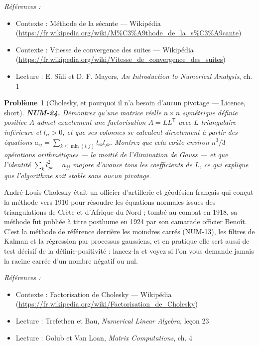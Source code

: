 \documentclass[11pt]{article}
\newtheorem{problem}{Problème}
\newenvironment{refs}{\par\small\noindent\emph{Références :}\begin{itemize}\setlength\itemsep{0pt}}{\end{itemize}\normalsize}
\begin{document}
\begin{refs}
\item Contexte : Méthode de la sécante --- Wikipédia (\url{https://fr.wikipedia.org/wiki/M%C3%A9thode_de_la_s%C3%A9cante})
\item Contexte : Vitesse de convergence des suites --- Wikipédia (\url{https://fr.wikipedia.org/wiki/Vitesse_de_convergence_des_suites})
\item Lecture : E. Süli et D. F. Mayers, \textit{An Introduction to Numerical Analysis}, ch. 1
\end{refs}

\bigskip

\begin{problem}[{Cholesky, et pourquoi il n'a besoin d'aucun pivotage --- Licence, short}]
\textbf{NUM-24.} Démontrez qu'une matrice réelle $n \times n$ symétrique définie positive $A$ admet exactement une factorisation $A = L L^{\mathsf T}$ avec $L$ triangulaire inférieure et $l_{ii} > 0$, et que ses colonnes se calculent directement à partir des équations $a_{ij} = \sum_{k \le \min(i,j)} l_{ik} l_{jk}$. Montrez que cela coûte environ $n^3/3$ opérations arithmétiques --- la moitié de l'élimination de Gauss --- et que l'identité $\sum_{k} l_{jk}^2 = a_{jj}$ majore d'avance tous les coefficients de $L$, ce qui explique que l'algorithme soit stable sans aucun pivotage.
\end{problem}

\noindent André-Louis Cholesky était un officier d'artillerie et géodésien français qui conçut la méthode vers 1910 pour résoudre les équations normales issues des triangulations de Crète et d'Afrique du Nord ; tombé au combat en 1918, sa méthode fut publiée à titre posthume en 1924 par son camarade officier Benoît. C'est la méthode de référence derrière les moindres carrés (NUM-13), les filtres de Kalman et la régression par processus gaussiens, et en pratique elle sert aussi de test décisif de la définie-positivité : lancez-la et voyez si l'on vous demande jamais la racine carrée d'un nombre négatif ou nul.

\begin{refs}
\item Contexte : Factorisation de Cholesky --- Wikipédia (\url{https://fr.wikipedia.org/wiki/Factorisation_de_Cholesky})
\item Lecture : Trefethen et Bau, \textit{Numerical Linear Algebra}, leçon 23
\item Lecture : Golub et Van Loan, \textit{Matrix Computations}, ch. 4
\end{refs}
\end{document}
